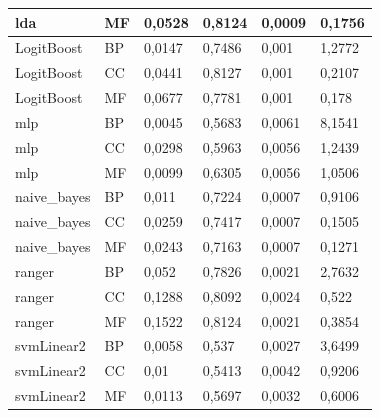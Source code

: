 \documentclass[12pt]{report}
\begin{document}
\begin{appendices}
\begin{table}[h]
\begin{tabular}{|l|l|l|l|l|l|}
lda                & MF            & 0,0528         & 0,8124         & 0,0009                   & 0,1756               \\ \hline
LogitBoost         & BP            & 0,0147         & 0,7486         & 0,001                    & 1,2772               \\ \hline
LogitBoost         & CC            & 0,0441         & 0,8127         & 0,001                    & 0,2107               \\ \hline
LogitBoost         & MF            & 0,0677         & 0,7781         & 0,001                    & 0,178                \\ \hline
mlp                & BP            & 0,0045         & 0,5683         & 0,0061                   & 8,1541               \\ \hline
mlp                & CC            & 0,0298         & 0,5963         & 0,0056                   & 1,2439               \\ \hline
mlp                & MF            & 0,0099         & 0,6305         & 0,0056                   & 1,0506               \\ \hline
naive\_bayes       & BP            & 0,011          & 0,7224         & 0,0007                   & 0,9106               \\ \hline
naive\_bayes       & CC            & 0,0259         & 0,7417         & 0,0007                   & 0,1505               \\ \hline
naive\_bayes       & MF            & 0,0243         & 0,7163         & 0,0007                   & 0,1271               \\ \hline
ranger             & BP            & 0,052          & 0,7826         & 0,0021                   & 2,7632               \\ \hline
ranger             & CC            & 0,1288         & 0,8092         & 0,0024                   & 0,522                \\ \hline
ranger             & MF            & 0,1522         & 0,8124         & 0,0021                   & 0,3854               \\ \hline
svmLinear2         & BP            & 0,0058         & 0,537          & 0,0027                   & 3,6499               \\ \hline
svmLinear2         & CC            & 0,01           & 0,5413         & 0,0042                   & 0,9206               \\ \hline
svmLinear2         & MF            & 0,0113         & 0,5697         & 0,0032                   & 0,6006               \\ \hline

\end{tabular}
\end{table}
\end{appendices}
\end{document}
